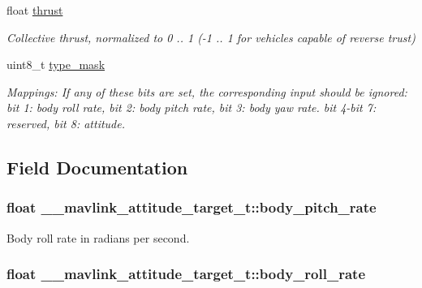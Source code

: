 \begin{DoxyCompactItemize}
float \hyperlink{struct____mavlink__attitude__target__t_a198f948867f37042f9c9077e84f2052a}{thrust}
\begin{DoxyCompactList}\small\item\em Collective thrust, normalized to 0 .. 1 (-\/1 .. 1 for vehicles capable of reverse trust) \end{DoxyCompactList}\item 
uint8\+\_\+t \hyperlink{struct____mavlink__attitude__target__t_a7e13f53152b3b1d8eda9a8bd1e7dce02}{type\+\_\+mask}
\begin{DoxyCompactList}\small\item\em Mappings\+: If any of these bits are set, the corresponding input should be ignored\+: bit 1\+: body roll rate, bit 2\+: body pitch rate, bit 3\+: body yaw rate. bit 4-\/bit 7\+: reserved, bit 8\+: attitude. \end{DoxyCompactList}\end{DoxyCompactItemize}


\subsection{Field Documentation}
\hypertarget{struct____mavlink__attitude__target__t_a3b3200787da434bba5de48ff5e0aec62}{
\subsubsection[{body\+\_\+pitch\+\_\+rate}]{\setlength{\rightskip}{0pt plus 5cm}float \+\_\+\+\_\+mavlink\+\_\+attitude\+\_\+target\+\_\+t\+::body\+\_\+pitch\+\_\+rate}}\label{struct____mavlink__attitude__target__t_a3b3200787da434bba5de48ff5e0aec62}


Body roll rate in radians per second. 

\hypertarget{struct____mavlink__attitude__target__t_a00211309ef8af7c5b9e62443e57704ae}{
\subsubsection[{body\+\_\+roll\+\_\+rate}]{\setlength{\rightskip}{0pt plus 5cm}float \+\_\+\+\_\+mavlink\+\_\+attitude\+\_\+target\+\_\+t\+::body\+\_\+roll\+\_\+rate}}\label{struct____mavlink__attitude__target__t_a00211309ef8af7c5b9e62443e57704ae}


